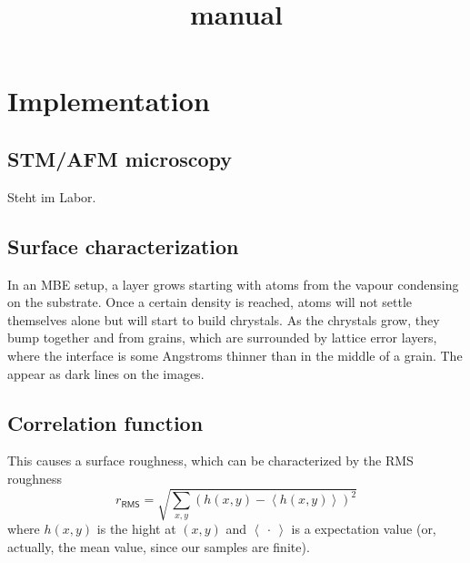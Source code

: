 \documentclass[11pt,a4paper]{article}
\title{\grainsize manual}
\begin{document}
\maketitle


\section{Implementation}
\subsection{STM/AFM microscopy}
Steht im Labor.
\subsection{Surface characterization}
In an MBE setup, a layer grows starting with atoms from the vapour condensing on the substrate. Once a certain density is reached, atoms will not settle themselves alone but will start to build chrystals. As the chrystals grow, they bump together and from grains, which are surrounded by lattice error layers, where the interface is some Angstroms thinner than in the middle of a grain. The appear as dark lines on the images.
\subsection{Correlation function}
This causes a surface roughness, which can be characterized by the RMS roughness
\begin{equation}
	r_{\textsf{RMS}}=\sqrt{\sum_{x,y}\left(h(x,y)-\left\langle h(x,y) \right\rangle\right)^2}
\end{equation}
where $h(x,y)$ is the hight at $(x,y)$ and $\left\langle~\cdot~\right\rangle$ is a expectation value (or, actually, the mean value, since our samples are finite).
\end{document}
